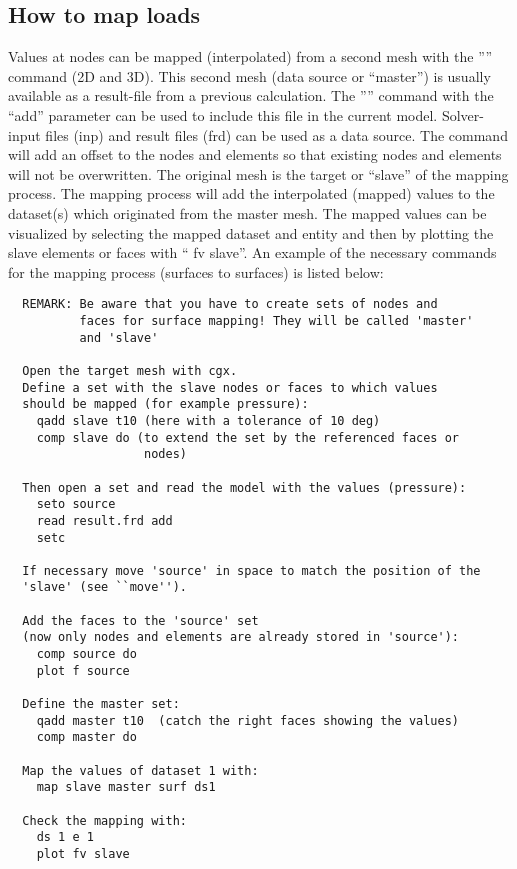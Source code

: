 \documentclass{article}
\begin{document}
\begin{appendix}
\subsection{\label{How to map loads}How to map loads}
Values at nodes can be mapped (interpolated) from a second mesh with the '''' command (2D and 3D). This second mesh (data source or ``master'') is usually available as a result-file from a previous calculation. The '''' command with the ``add'' parameter can be used to include this file in the current model. Solver-input files (inp) and result files (frd) can be used as a data source. The command will add an offset to the nodes and elements so that existing nodes and elements will not be overwritten. The original mesh is the target or ``slave'' of the mapping process. The mapping process will add the interpolated (mapped) values to the dataset(s) which originated from the master mesh. The mapped values can be visualized by selecting the mapped dataset and entity and then by plotting the slave elements or faces with `` fv slave''. An example of the necessary commands for the mapping process (surfaces to surfaces) is listed below:
\begin{verbatim}
  REMARK: Be aware that you have to create sets of nodes and
          faces for surface mapping! They will be called 'master'
          and 'slave'

  Open the target mesh with cgx.
  Define a set with the slave nodes or faces to which values
  should be mapped (for example pressure):
    qadd slave t10 (here with a tolerance of 10 deg)
    comp slave do (to extend the set by the referenced faces or
                   nodes)

  Then open a set and read the model with the values (pressure):
    seto source
    read result.frd add
    setc

  If necessary move 'source' in space to match the position of the
  'slave' (see ``move'').

  Add the faces to the 'source' set
  (now only nodes and elements are already stored in 'source'):
    comp source do
    plot f source

  Define the master set:
    qadd master t10  (catch the right faces showing the values)
    comp master do

  Map the values of dataset 1 with:
    map slave master surf ds1

  Check the mapping with:
    ds 1 e 1
    plot fv slave


\end{verbatim}
\end{appendix}
\end{document}
